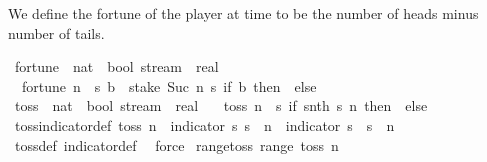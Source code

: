 \begin{isabellebody}
\endisatagproof
{\isafoldproof}%
%
\isadelimproof
%
\endisadelimproof
%
\begin{isamarkuptext}%
We define the fortune of the player at time  to be the number of heads minus number of tails.%
\end{isamarkuptext}\isamarkuptrue%
\isamarkupfalse%
\ fortune\ {\isacharcolon}{\kern0pt}{\isacharcolon}{\kern0pt}\ {\isachardoublequoteopen}nat\ {\isasymRightarrow}\ bool\ stream\ {\isasymRightarrow}\ real{\isachardoublequoteclose}\ \isanewline
\ \ {\isachardoublequoteopen}fortune\ n\ {\isacharequal}{\kern0pt}\ {\isacharparenleft}{\kern0pt}{\isasymlambda}s{\isachardot}{\kern0pt}\ {\isasymSum}b\ {\isasymleftarrow}\ stake\ {\isacharparenleft}{\kern0pt}Suc\ n{\isacharparenright}{\kern0pt}\ s{\isachardot}{\kern0pt}\ if\ b\ then\ {}\ else\ {\isacharminus}{\kern0pt}{}{\isacharparenright}{\kern0pt}{\isachardoublequoteclose}\isanewline
\isanewline
{}\isamarkupfalse%
\ toss\ {\isacharcolon}{\kern0pt}{\isacharcolon}{\kern0pt}\ {\isachardoublequoteopen}nat\ {\isasymRightarrow}\ bool\ stream\ {\isasymRightarrow}\ real{\isachardoublequoteclose}\ \isanewline
\ \ {\isachardoublequoteopen}toss\ n\ {\isacharequal}{\kern0pt}\ {\isacharparenleft}{\kern0pt}{\isasymlambda}s{\isachardot}{\kern0pt}\ if\ snth\ s\ n\ then\ {}\ else\ {\isacharminus}{\kern0pt}{}{\isacharparenright}{\kern0pt}{\isachardoublequoteclose}\isanewline
\isanewline
{}\isamarkupfalse%
\ toss{\isacharunderscore}{\kern0pt}indicator{\isacharunderscore}{\kern0pt}def{\isacharcolon}{\kern0pt}\ {\isachardoublequoteopen}toss\ n\ {\isacharequal}{\kern0pt}\ indicator\ {\isacharbraceleft}{\kern0pt}s{\isachardot}{\kern0pt}\ s\ {\isacharbang}{\kern0pt}{\isacharbang}{\kern0pt}\ n{\isacharbraceright}{\kern0pt}\ {\isacharminus}{\kern0pt}\ indicator\ {\isacharbraceleft}{\kern0pt}s{\isachardot}{\kern0pt}\ {\isasymnot}\ s\ {\isacharbang}{\kern0pt}{\isacharbang}{\kern0pt}\ n{\isacharbraceright}{\kern0pt}{\isachardoublequoteclose}\isanewline
%
\isadelimproof
\ \ %
\endisadelimproof
%
\isatagproof
{}\isamarkupfalse%
\ toss{\isacharunderscore}{\kern0pt}def\ indicator{\isacharunderscore}{\kern0pt}def\ \isamarkupfalse%
\ force%
\endisatagproof
{\isafoldproof}%
%
\isadelimproof
\isanewline
%
\endisadelimproof
\isanewline
{}\isamarkupfalse%
\ range{\isacharunderscore}{\kern0pt}toss{\isacharcolon}{\kern0pt}\ {\isachardoublequoteopen}range\ {\isacharparenleft}{\kern0pt}toss\ n{\isacharparenright}{\kern0pt}\ {\isacharequal}{\kern0pt}\ {\isacharbraceleft}{\kern0pt}{\isacharminus}{\kern0pt}{}{\isacharcomma}{\kern0pt}\ {}{\isacharbraceright}{\kern0pt}{\isachardoublequoteclose}\isanewline

\end{isabellebody}
